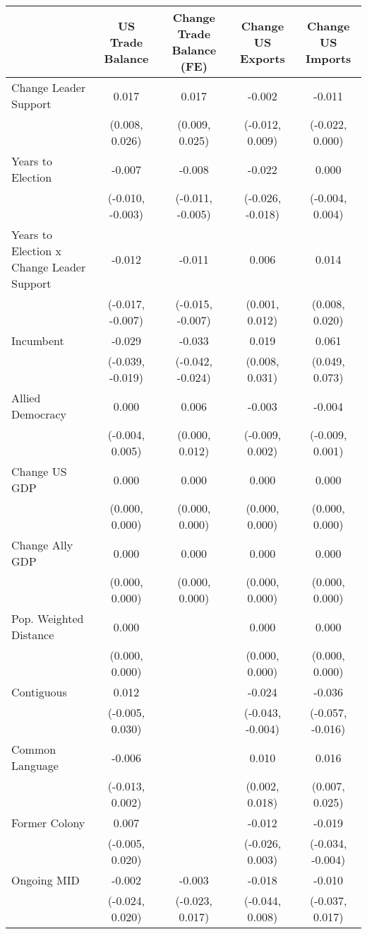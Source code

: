 
\begin{tabular}[t]{lcccc}
\toprule
  & US Trade Balance & Change Trade Balance (FE) & Change US Exports & Change US Imports\\
\midrule
Change Leader Support & 0.017 & 0.017 & -0.002 & -0.011\\
 & (0.008, 0.026) & (0.009, 0.025) & (-0.012, 0.009) & (-0.022, 0.000)\\
Years to Election & -0.007 & -0.008 & -0.022 & 0.000\\
 & (-0.010, -0.003) & (-0.011, -0.005) & (-0.026, -0.018) & (-0.004, 0.004)\\
Years to Election x Change Leader Support & -0.012 & -0.011 & 0.006 & 0.014\\
 & (-0.017, -0.007) & (-0.015, -0.007) & (0.001, 0.012) & (0.008, 0.020)\\
Incumbent & -0.029 & -0.033 & 0.019 & 0.061\\
 & (-0.039, -0.019) & (-0.042, -0.024) & (0.008, 0.031) & (0.049, 0.073)\\
Allied Democracy & 0.000 & 0.006 & -0.003 & -0.004\\
 & (-0.004, 0.005) & (0.000, 0.012) & (-0.009, 0.002) & (-0.009, 0.001)\\
Change US GDP & 0.000 & 0.000 & 0.000 & 0.000\\
 & (0.000, 0.000) & (0.000, 0.000) & (0.000, 0.000) & (0.000, \vphantom{1} 0.000)\\
Change Ally GDP & 0.000 & 0.000 & 0.000 & 0.000\\
 & (0.000, 0.000) & (0.000, 0.000) & (0.000, 0.000) & (0.000, 0.000)\\
Pop. Weighted Distance & 0.000 &  & 0.000 & 0.000\\
 & (0.000, 0.000) &  & (0.000, 0.000) & (0.000, 0.000)\\
Contiguous & 0.012 &  & -0.024 & -0.036\\
 & (-0.005, 0.030) &  & (-0.043, -0.004) & (-0.057, -0.016)\\
Common Language & -0.006 &  & 0.010 & 0.016\\
 & (-0.013, 0.002) &  & (0.002, 0.018) & (0.007, 0.025)\\
Former Colony & 0.007 &  & -0.012 & -0.019\\
 & (-0.005, 0.020) &  & (-0.026, 0.003) & (-0.034, -0.004)\\
Ongoing MID & -0.002 & -0.003 & -0.018 & -0.010\\
 & (-0.024, 0.020) & (-0.023, 0.017) & (-0.044, 0.008) & (-0.037, 0.017)\\

\end{tabular}
